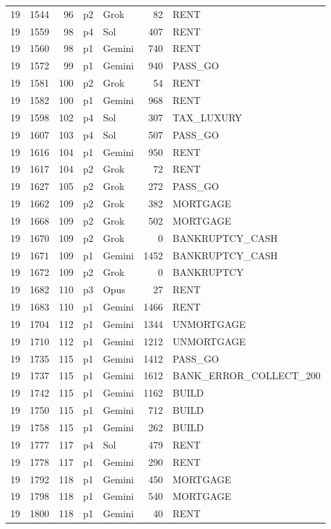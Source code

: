 \begin{longtable}{r r r l l r L{2.2in}}
19 & 1544 & 96 & p2 & Grok & 82 & RENT \\
19 & 1559 & 98 & p4 & Sol & 407 & RENT \\
19 & 1560 & 98 & p1 & Gemini & 740 & RENT \\
19 & 1572 & 99 & p1 & Gemini & 940 & PASS\_GO \\
19 & 1581 & 100 & p2 & Grok & 54 & RENT \\
19 & 1582 & 100 & p1 & Gemini & 968 & RENT \\
19 & 1598 & 102 & p4 & Sol & 307 & TAX\_LUXURY \\
19 & 1607 & 103 & p4 & Sol & 507 & PASS\_GO \\
19 & 1616 & 104 & p1 & Gemini & 950 & RENT \\
19 & 1617 & 104 & p2 & Grok & 72 & RENT \\
19 & 1627 & 105 & p2 & Grok & 272 & PASS\_GO \\
19 & 1662 & 109 & p2 & Grok & 382 & MORTGAGE \\
19 & 1668 & 109 & p2 & Grok & 502 & MORTGAGE \\
19 & 1670 & 109 & p2 & Grok & 0 & BANKRUPTCY\_CASH \\
19 & 1671 & 109 & p1 & Gemini & 1452 & BANKRUPTCY\_CASH \\
19 & 1672 & 109 & p2 & Grok & 0 & BANKRUPTCY \\
19 & 1682 & 110 & p3 & Opus & 27 & RENT \\
19 & 1683 & 110 & p1 & Gemini & 1466 & RENT \\
19 & 1704 & 112 & p1 & Gemini & 1344 & UNMORTGAGE \\
19 & 1710 & 112 & p1 & Gemini & 1212 & UNMORTGAGE \\
19 & 1735 & 115 & p1 & Gemini & 1412 & PASS\_GO \\
19 & 1737 & 115 & p1 & Gemini & 1612 & BANK\_ERROR\_COLLECT\_200 \\
19 & 1742 & 115 & p1 & Gemini & 1162 & BUILD \\
19 & 1750 & 115 & p1 & Gemini & 712 & BUILD \\
19 & 1758 & 115 & p1 & Gemini & 262 & BUILD \\
19 & 1777 & 117 & p4 & Sol & 479 & RENT \\
19 & 1778 & 117 & p1 & Gemini & 290 & RENT \\
19 & 1792 & 118 & p1 & Gemini & 450 & MORTGAGE \\
19 & 1798 & 118 & p1 & Gemini & 540 & MORTGAGE \\
19 & 1800 & 118 & p1 & Gemini & 40 & RENT \\

\end{longtable}
